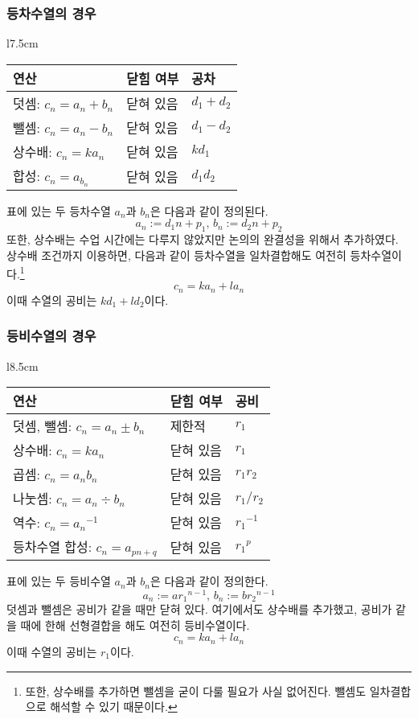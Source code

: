 \documentclass{scrartcl}
\begin{document}
\subsubsection{등차수열의 경우}
\begin{wrapfigure}[11]{l}{7.5cm}
\bgroup
\def\arraystretch{1.5}
\begin{tabular}{|lll|}
\hline
연산                  & 닫힘 여부 & 공차            \\ \hline
덧셈: \(c_n=a_n+b_n\) & 닫혀 있음 & \(d_1 + d_2\) \\
뺄셈: \(c_n=a_n-b_n\) & 닫혀 있음 & \(d_1 - d_2\) \\
상수배: \(c_n=ka_n\)   & 닫혀 있음 & \(kd_1\)      \\
합성: \(c_n=a_{b_n}\) & 닫혀 있음 & \(d_1d_2\)    \\ \hline
\end{tabular}
\egroup
\end{wrapfigure}
표에 있는 두 등차수열 \(a_n\)과 \(b_n\)은 다음과 같이 정의된다.
\[
a_n:=d_1n+p_1,\,b_n:=d_2n+p_2
\]
또한, 상수배는 수업 시간에는 다루지 않았지만 논의의 완결성을 위해서 추가하였다. 상수배 조건까지 이용하면, 다음과 같이 등차수열을 일차결합해도 여전히 등차수열이다.\footnote{또한, 상수배를 추가하면 뺄셈을 굳이 다룰 필요가 사실 없어진다. 뺄셈도 일차결합으로 해석할 수 있기 때문이다.}
\[
c_n=ka_n+la_n
\]
이때 수열의 공비는 \(kd_1+ld_2\)이다.

\subsubsection{등비수열의 경우}
\begin{wrapfigure}[11]{l}{8.5cm}
\bgroup
\def\arraystretch{1.5}
\begin{tabular}{|lll|}
\hline
연산                         & 닫힘 여부 & 공비             \\ \hline
덧셈, 뺄셈: \(c_n=a_n\pm b_n\) & 제한적   & \(r_1\)        \\
상수배: \(c_n=ka_n\)          & 닫혀 있음 & \(r_1\)        \\
곱셈: \(c_n=a_nb_n\)         & 닫혀 있음 & \(r_1r_2\)     \\
나눗셈: \(c_n=a_n\div b_n\)   & 닫혀 있음 & \(r_1/r_2\)    \\
역수: \(c_n={a_n}^{-1}\)     & 닫혀 있음 & \({r_1}^{-1}\) \\
등차수열 합성: \(c_n=a_{pn+q}\)  & 닫혀 있음 & \({r_1}^p\)    \\ \hline
\end{tabular}
\egroup
\end{wrapfigure}
표에 있는 두 등비수열 \(a_n\)과 \(b_n\)은 다음과 같이 정의한다.
\[
a_n:=a{r_1}^{n-1},\,b_n:=b{r_2}^{n-1}
\]
덧셈과 뺄셈은 공비가 같을 때만 닫혀 있다. 여기에서도 상수배를 추가했고, 공비가 같을 때에 한해 선형결합을 해도 여전히 등비수열이다.
\[
c_n=ka_n+la_n
\]
이때 수열의 공비는 \(r_1\)이다.
\end{document}
